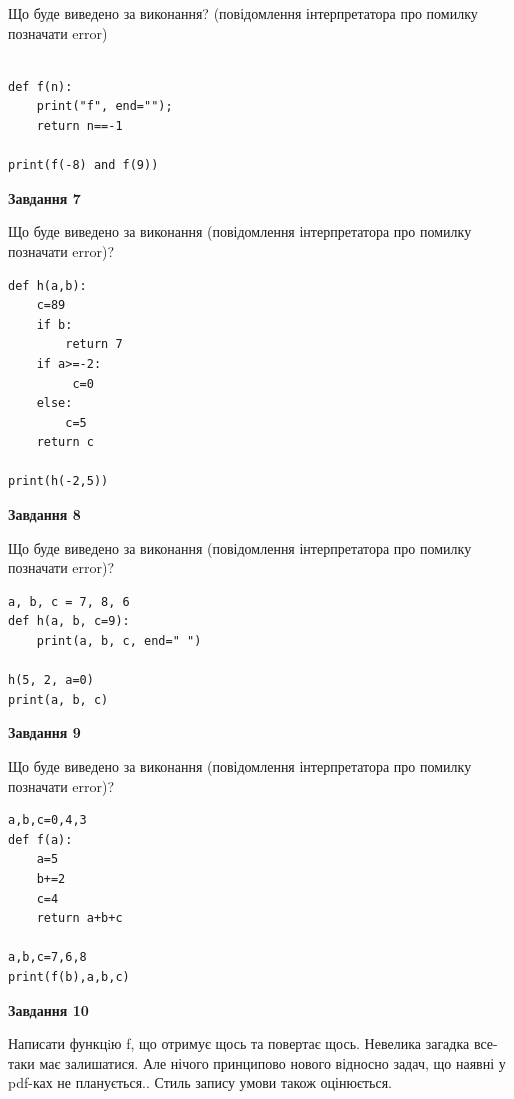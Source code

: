 \documentclass[12pt, ukrainian]{article}
\begin{document}
{\begin {large}
Що буде виведено за виконання? (повідомлення інтерпретатора про помилку позначати error)\par
\begin{verbatim}

def f(n):
    print("f", end="");
    return n==-1

print(f(-8) and f(9))
\end{verbatim}

{\begin {center}\textbf{Завдання 7}\end {center}}

Що буде виведено за виконання (повідомлення інтерпретатора про помилку позначати error)?\par
\begin{verbatim}
def h(a,b):
    c=89
    if b:
        return 7
    if a>=-2:
         c=0
    else: 
        c=5
    return c

print(h(-2,5))
\end{verbatim}

{\begin {center}\textbf{Завдання 8}\end {center}}

Що буде виведено за виконання (повідомлення інтерпретатора про помилку позначати error)?\par
\begin{verbatim}
a, b, c = 7, 8, 6
def h(a, b, c=9):
    print(a, b, c, end=" ")

h(5, 2, a=0)
print(a, b, c)
\end{verbatim}

{\begin {center}\textbf{Завдання 9}\end {center}}

Що буде виведено за виконання (повідомлення інтерпретатора про помилку позначати error)?\par
\begin{verbatim}
a,b,c=0,4,3
def f(a):
    a=5
    b+=2
    c=4
    return a+b+c

a,b,c=7,6,8
print(f(b),a,b,c)
\end{verbatim}

{\begin {center}\textbf{Завдання 10}\end {center}}


Написати функцiю f, що отримує щось та повертає щось. Невелика загадка все-таки має залишатися. Але нічого принципово нового відносно задач, що наявні у pdf-ках не планується.. Стиль запису умови також оцінюється.\par
\end {large}}
\newpage
\end{document}
